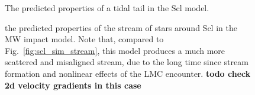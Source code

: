 \begin{figure}
\centering
{}
\caption[Scl predicted stream]{The predicted properties of a tidal tail
in the Scl model.}\label{fig:scl_tidal_stream}
\end{figure}

\begin{figure}
\centering
{}
\caption[Scl predicted stream]{the predicted properties of the stream of
stars around Scl in the MW impact model. Note that, compared to
Fig.~\ref{fig:scl_sim_stream}, this model produces a much more scattered
and misaligned stream, due to the long time since stream formation and
nonlinear effects of the LMC encounter. \textbf{todo check 2d velocity
gradients in this case}}\label{fig:scl_mw_impact_tidal_stream}
\end{figure}
